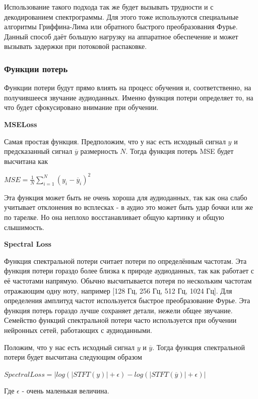 \documentclass[14pt]{extarticle}
\begin{document}
Использование такого подхода так же будет вызывать трудности и с декодированием спектрограммы. Для этого тоже используются специальные алгоритмы
Гриффина-Лима или обратного быстрого преобразования Фурье. Данный способ даёт большую нагрузку на аппаратное обеспечение и может вызывать задержки при
потоковой распаковке.

\subsubsection{Функции потерь}

Функции потери будут прямо влиять на процесс обучения и, соответственно, на получившееся звучание аудиоданных.
Именно функция потери определяет то, на что будет сфокусировано внимание при обучении.

\par\textbf{MSELoss}

Самая простая функция. Предположим, что у нас есть исходный сигнал $y$ и предсказанный сигнал $\overline{y}$ размерность $N$. Тогда функция потерь MSE будет высчитана как

$MSE = \frac{1}{N} \sum_{i=1}^{N}(y_i - \overline{y}_i) ^ 2$

Эта функция может быть не очень хороша для аудиоданных, так как она слабо учитывает отклонения во всплесках - в аудио это может быть
удар бочки или же по тарелке. Но она неплохо восстанавливает общую картинку и общую слышимость.

\par\textbf{Spectral Loss}

Функция спектральной потери считает потери по определённым частотам. Эта функция потери гораздо более близка к природе аудиоданных, 
так как работает с её частотами напрямую. Обычно высчитывается потеря по нескольким частотам отражающим одну ноту, например [128 Гц, 256 Гц, 512 Гц, 1024 Гц]. 
Для определения амплитуд частот используется быстрое преобразование Фурье.
Эта функция потерь гораздо лучше сохраняет детали, нежели общее звучание. Семейство функций спектральной потери часто используется при обучении
нейронных сетей, работающих с аудиоданными.

Положим, что у нас есть исходный сигнал $y$ и $\overline{y}$. Тогда функция спектральной потери будет высчитана следующим образом

$SpectralLoss = |log(|STFT(y)| + \epsilon) - log(|STFT(\overline{y})| + \epsilon)|$

Где $\epsilon$ - очень маленькая величина.
\end{document}
